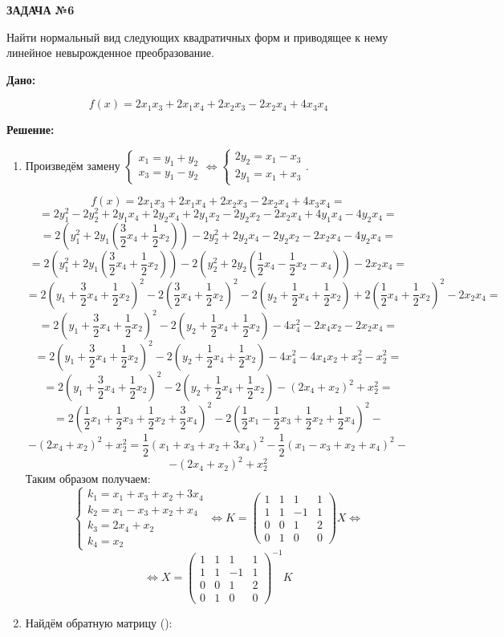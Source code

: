 \documentclass[a4paper]{article}
\begin{document}
\par
	\begin{center}
		\textbf{ЗАДАЧА №6}
	\end{center}
	\par
	Найти нормальный вид следующих квадратичных форм и приводящее к нему линейное 
	невырожденное преобразование.
	\par
	\textbf{Дано:}
	\par
	$$f(x)=2x_1x_3+2x_1x_4+2x_2x_3-2x_2x_4+4x_3x_4$$
	\par
	\textbf{Решение:}
	\begin{enumerate}
		\item Произведём замену $\begin{cases}x_1=y_1+y_2\\x_3=y_1-y_2\end{cases}\Leftrightarrow\begin{cases}2y_2=x_1-x_3\\2y_1=x_1+x_3\end{cases}$.
		
		$$f(x)=2x_1x_3+2x_1x_4+2x_2x_3-2x_2x_4+4x_3x_4=$$
		$$=2y_1^2-2y_2^2+2y_1x_4+2y_2x_4+2y_1x_2-2y_2x_2-2x_2x_4+4y_1x_4-4y_2x_4=$$
		$$=2(y_1^2+2y_1(\frac{3}{2}x_4+\frac{1}{2}x_2))-2y_2^2+2y_2x_4-2y_2x_2-2x_2x_4-4y_2x_4=$$
		$$=2(y_1^2+2y_1(\frac{3}{2}x_4+\frac{1}{2}x_2))-2(y_2^2+2y_2(\frac{1}{2}x_4-\frac{1}{2}x_2-x_4))-2x_2x_4=$$
		$$=2(y_1+\frac{3}{2}x_4+\frac{1}{2}x_2)^2-2(\frac{3}{2}x_4+\frac{1}{2}x_2)^2-2(y_2+\frac{1}{2}x_4+\frac{1}{2}x_2)+2(\frac{1}{2}x_4+\frac{1}{2}x_2)^2-2x_2x_4=$$
		$$=2(y_1+\frac{3}{2}x_4+\frac{1}{2}x_2)^2-2(y_2+\frac{1}{2}x_4+\frac{1}{2}x_2)-4x_4^2-2x_4x_2-2x_2x_4=$$
		$$=2(y_1+\frac{3}{2}x_4+\frac{1}{2}x_2)^2-2(y_2+\frac{1}{2}x_4+\frac{1}{2}x_2)-4x_4^2-4x_4x_2+x_2^2-x_2^2=$$
		$$=2(y_1+\frac{3}{2}x_4+\frac{1}{2}x_2)^2-2(y_2+\frac{1}{2}x_4+\frac{1}{2}x_2)-(2x_4+x_2)^2+x_2^2=$$
		$$=2(\frac{1}{2}x_1+\frac{1}{2}x_3+\frac{1}{2}x_2+\frac{3}{2}x_4)^2-2(\frac{1}{2}x_1-\frac{1}{2}x_3+\frac{1}{2}x_2+\frac{1}{2}x_4)^2-$$
		$$-(2x_4+x_2)^2+x_2^2=\frac{1}{2}(x_1+x_3+x_2+3x_4)^2-\frac{1}{2}(x_1-x_3+x_2+x_4)^2-$$
		$$-(2x_4+x_2)^2+x_2^2$$
		Таким образом получаем:
		$$\begin{cases}
			k_1 = x_1+x_3+x_2+3x_4\\
			k_2 = x_1-x_3+x_2+x_4\\
			k_3 = 2x_4+x_2\\
			k_4 = x_2
		\end{cases}\Leftrightarrow
		K=\begin{pmatrix}1 & 1 & 1 & 1\\1 & 1 & -1 & 1\\0 & 0 & 1 & 2\\0 & 1 & 0& 0\end{pmatrix}X\Leftrightarrow$$
		$$\Leftrightarrow X=\begin{pmatrix}1 & 1 & 1 & 1\\1 & 1 & -1 & 1\\0 & 0 & 1 & 2\\0 & 1 & 0& 0\end{pmatrix}^{-1}K$$
		\item Найдём обратную матрицу ():
	
	\end{enumerate}
	
	
\end{document}
